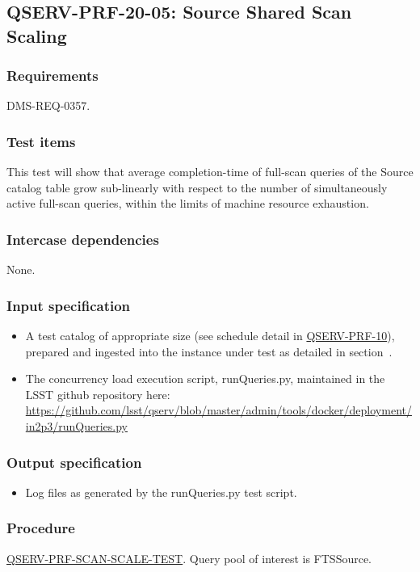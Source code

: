 \subsection{\textsc{QSERV-PRF-20-05}: Source Shared Scan Scaling}
\label{qserv-prf-20-05}

\subsubsection{Requirements}

DMS-REQ-0357.

\subsubsection{Test items}

This test will show that average completion-time of full-scan queries of the Source catalog table grow
sub-linearly with respect to the number of simultaneously active full-scan queries, within the limits of
machine resource exhaustion.

\subsubsection{Intercase dependencies}

None.

\subsubsection{Input specification}

\begin{itemize}

  \item{A test catalog of appropriate size (see schedule detail in \hyperref[qserv-prf-10]{\textsc{
  QSERV-PRF-10}}), prepared and ingested into the \product{} instance under test as detailed in
  section~.}

  \item{The concurrency load execution script, runQueries.py, maintained in the LSST \product{}
  github repository here: \url{https://github.com/lsst/qserv/blob/master/admin/tools/docker/deployment/in2p3/runQueries.py}}

\end{itemize}

\subsubsection{Output specification}

\begin{itemize}
  \item{Log files as generated by the runQueries.py test script.}
\end{itemize}

\subsubsection{Procedure}

\hyperref[qserv-prf-scan-scale-test]{\textsc{QSERV-PRF-SCAN-SCALE-TEST}}.
Query pool of interest is FTSSource.
